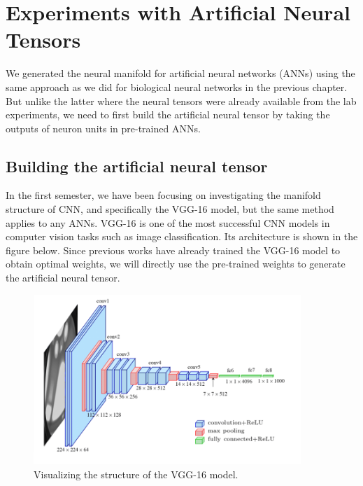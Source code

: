 \chapter{Experiments with Artificial Neural Tensors} 
\label{chapter-artifical} 
We generated the neural manifold for artificial neural networks (ANNs) using the same approach as we did for biological neural networks in the previous chapter. But unlike the latter where the neural tensors were already available from the lab experiments, we need to first build the artificial neural tensor by taking the outputs of neuron units in pre-trained ANNs. 

\section{Building the artificial neural tensor}
In the first semester, we have been focusing on investigating the manifold structure of CNN, and specifically the VGG-16 model, but the same method applies to any ANNs. VGG-16 is one of the most successful CNN models in computer vision tasks such as image classification. Its architecture is shown in the figure below. Since previous works have already trained the VGG-16 model to obtain optimal weights, we will directly use the pre-trained weights to generate the artificial neural tensor. 

\begin{figure}[H]
        \centering
            \includegraphics[width=0.9\textwidth]{figures/artificial/vgg16.png}
            \caption{Visualizing the structure of the VGG-16 model.}
    \end{figure}
    
